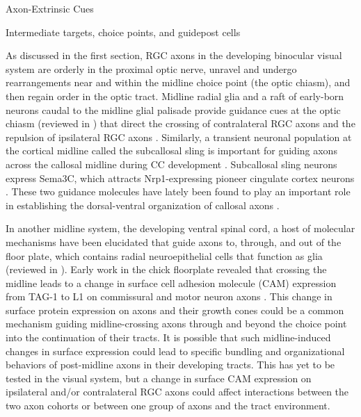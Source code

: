 Axon-Extrinsic Cues

Intermediate targets, choice points, and guidepost cells 

As discussed in the first section, RGC axons in the developing binocular visual system are orderly in the proximal optic nerve, unravel and undergo rearrangements near and within the midline choice point (the optic chiasm), and then regain order in the optic tract. 
Midline radial glia and a raft of early-born neurons caudal to the midline glial palisade provide guidance cues at the optic chiasm (reviewed in \cite{erskine2014connecting,petros2008retinal}) that direct the crossing of contralateral RGC axons \cite{charron2003morphogen,erskine2011vegf,kuwajima2012optic,williams2006role} and the repulsion of ipsilateral RGC axons \cite{williams2003ephrin,petros2010ephrin,petros2009specificity,}. 
Similarly, a transient neuronal population at the cortical midline called the subcallosal sling is important for guiding axons across the callosal midline during CC development \cite{suarez2014evolution}. 
Subcallosal sling neurons express Sema3C, which attracts Nrp1-expressing pioneer cingulate cortex neurons \cite{niquille2009transient,piper2009neuropilin}. 
These two guidance molecules have lately been found to play an important role in establishing the dorsal-ventral organization of callosal axons \cite{zhou2013axon}. 

In another midline system, the developing ventral spinal cord, a host of molecular mechanisms have been elucidated that guide axons to, through, and out of the floor plate, which contains radial neuroepithelial cells that function as glia (reviewed in \cite{neuhaus2015crossing}). 
Early work in the chick floorplate revealed that crossing the midline leads to a change in surface cell adhesion molecule (CAM) expression from TAG-1 to L1 on commissural and motor neuron axons \cite{dodd1988spatial}. 
This change in surface protein expression on axons and their growth cones could be a common mechanism guiding midline-crossing axons through and beyond the choice point into the continuation of their tracts. 
It is possible that such midline-induced changes in surface expression could lead to specific bundling and organizational behaviors of post-midline axons in their developing tracts. 
This has yet to be tested in the visual system, but a change in surface CAM expression on ipsilateral and/or contralateral RGC axons could affect interactions between the two axon cohorts or between one group of axons and the tract environment. 


